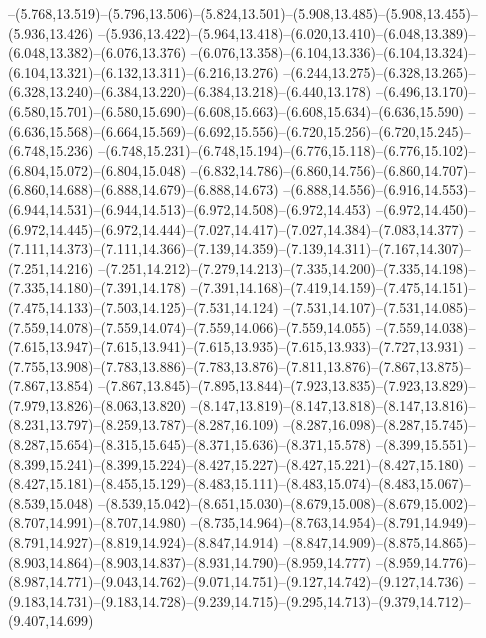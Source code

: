   --(5.768,13.519)--(5.796,13.506)--(5.824,13.501)--(5.908,13.485)--(5.908,13.455)--(5.936,13.426)%
  --(5.936,13.422)--(5.964,13.418)--(6.020,13.410)--(6.048,13.389)--(6.048,13.382)--(6.076,13.376)%
  --(6.076,13.358)--(6.104,13.336)--(6.104,13.324)--(6.104,13.321)--(6.132,13.311)--(6.216,13.276)%
  --(6.244,13.275)--(6.328,13.265)--(6.328,13.240)--(6.384,13.220)--(6.384,13.218)--(6.440,13.178)%
  --(6.496,13.170)--(6.580,15.701)--(6.580,15.690)--(6.608,15.663)--(6.608,15.634)--(6.636,15.590)%
  --(6.636,15.568)--(6.664,15.569)--(6.692,15.556)--(6.720,15.256)--(6.720,15.245)--(6.748,15.236)%
  --(6.748,15.231)--(6.748,15.194)--(6.776,15.118)--(6.776,15.102)--(6.804,15.072)--(6.804,15.048)%
  --(6.832,14.786)--(6.860,14.756)--(6.860,14.707)--(6.860,14.688)--(6.888,14.679)--(6.888,14.673)%
  --(6.888,14.556)--(6.916,14.553)--(6.944,14.531)--(6.944,14.513)--(6.972,14.508)--(6.972,14.453)%
  --(6.972,14.450)--(6.972,14.445)--(6.972,14.444)--(7.027,14.417)--(7.027,14.384)--(7.083,14.377)%
  --(7.111,14.373)--(7.111,14.366)--(7.139,14.359)--(7.139,14.311)--(7.167,14.307)--(7.251,14.216)%
  --(7.251,14.212)--(7.279,14.213)--(7.335,14.200)--(7.335,14.198)--(7.335,14.180)--(7.391,14.178)%
  --(7.391,14.168)--(7.419,14.159)--(7.475,14.151)--(7.475,14.133)--(7.503,14.125)--(7.531,14.124)%
  --(7.531,14.107)--(7.531,14.085)--(7.559,14.078)--(7.559,14.074)--(7.559,14.066)--(7.559,14.055)%
  --(7.559,14.038)--(7.615,13.947)--(7.615,13.941)--(7.615,13.935)--(7.615,13.933)--(7.727,13.931)%
  --(7.755,13.908)--(7.783,13.886)--(7.783,13.876)--(7.811,13.876)--(7.867,13.875)--(7.867,13.854)%
  --(7.867,13.845)--(7.895,13.844)--(7.923,13.835)--(7.923,13.829)--(7.979,13.826)--(8.063,13.820)%
  --(8.147,13.819)--(8.147,13.818)--(8.147,13.816)--(8.231,13.797)--(8.259,13.787)--(8.287,16.109)%
  --(8.287,16.098)--(8.287,15.745)--(8.287,15.654)--(8.315,15.645)--(8.371,15.636)--(8.371,15.578)%
  --(8.399,15.551)--(8.399,15.241)--(8.399,15.224)--(8.427,15.227)--(8.427,15.221)--(8.427,15.180)%
  --(8.427,15.181)--(8.455,15.129)--(8.483,15.111)--(8.483,15.074)--(8.483,15.067)--(8.539,15.048)%
  --(8.539,15.042)--(8.651,15.030)--(8.679,15.008)--(8.679,15.002)--(8.707,14.991)--(8.707,14.980)%
  --(8.735,14.964)--(8.763,14.954)--(8.791,14.949)--(8.791,14.927)--(8.819,14.924)--(8.847,14.914)%
  --(8.847,14.909)--(8.875,14.865)--(8.903,14.864)--(8.903,14.837)--(8.931,14.790)--(8.959,14.777)%
  --(8.959,14.776)--(8.987,14.771)--(9.043,14.762)--(9.071,14.751)--(9.127,14.742)--(9.127,14.736)%
  --(9.183,14.731)--(9.183,14.728)--(9.239,14.715)--(9.295,14.713)--(9.379,14.712)--(9.407,14.699)%
